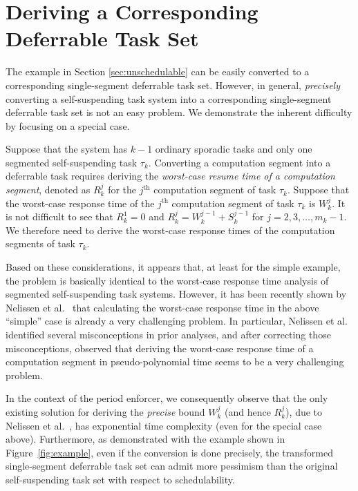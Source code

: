 
\section{Deriving a Corresponding Deferrable Task Set}
\label{sec:convert}

The example in Section \ref{sec:unschedulable} can be easily converted to a corresponding single-segment deferrable task set. However, in general,  \emph{precisely} converting a self-suspending task system into a corresponding single-segment  deferrable task set is not an easy problem. We demonstrate the inherent difficulty by focusing on a special case.

Suppose that the system has $k-1$ ordinary sporadic tasks and only one segmented self-suspending task $\tau_k$. Converting a computation segment into a deferrable task requires deriving the \emph{worst-case resume time of a computation segment}, denoted as $R_k^j$ for the $j^{\mathrm{th}}$ computation segment of task $\tau_k$. Suppose that the worst-case response time of the $j^{\mathrm{th}}$ computation segment of task $\tau_k$ is $W_k^j$. It is not difficult to see that $R_k^1=0$ and $R_k^j = W_k^{j-1}+S_k^{j-1}$ for $j=2,3,\ldots,m_k-1$. We therefore need to derive the worst-case response times of the computation segments of task $\tau_k$. 

Based on these considerations, it appears that, at least for the simple example,  the problem is basically identical to the worst-case response time analysis of segmented self-suspending task systems.  However, it has been recently shown by Nelissen et al.\ \cite{ecrts15nelissen} that calculating the worst-case response time in the above ``simple'' case is already a very challenging problem. In particular, Nelissen et al.\ \cite{ecrts15nelissen} identified several misconceptions in prior analyses, and after correcting those misconceptions, observed that deriving the worst-case response time of a computation segment in pseudo-polynomial time seems to be a very challenging problem. 



In the context of the period enforcer, we consequently observe that the only existing solution for deriving the \emph{precise} bound $W_k^{j}$ (and hence $R_k^j$), due to Nelissen et al.\ \cite{ecrts15nelissen},  has exponential time complexity (even for the special case above). Furthermore, as demonstrated with the example shown in Figure~\ref{fig:example}, even if the conversion is done precisely, the transformed single-segment deferrable task set can admit more pessimism than the original self-suspending task set with respect to schedulability.
